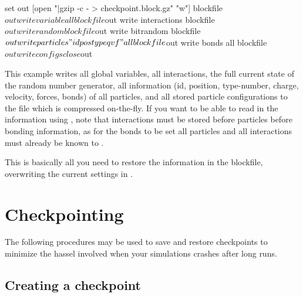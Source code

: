 \begin{tclcode}
set out [open "|gzip -c - > checkpoint.block.gz" "w"]
blockfile $out write variable all
blockfile $out write interactions
blockfile $out write random
blockfile $out write bitrandom
blockfile $out write particles "id pos type q v f" all
blockfile $out write bonds all
blockfile $out write configs
close $out 
\end{tclcode}

This example writes all global variables, all interactions, the full
current state of the random number generator, all information (\ie id,
position, type-number, charge, velocity, forces, bonds) of all
particles, and all stored particle configurations to the file
 which is compressed on-the-fly.  If you want
to be able to read in the information using \es, note that
interactions must be stored before particles before bonding
information, as for the bonds to be set all particles and all
interactions must already be known to \es.

This is basically all you need to restore the information in the
blockfile, overwriting the current settings in \es.


\section{Checkpointing}

The following procedures may be used to save and restore checkpoints
to minimize the hassel involved when your simulations crashes after
long runs.

\subsection{Creating a checkpoint}

